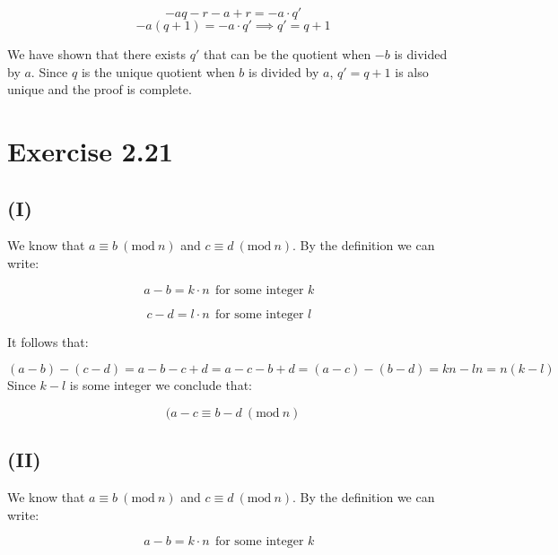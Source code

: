 \documentclass{article}
\begin{document}
\begin{equation*}
	-aq - r - a + r = -a \cdot q'
\end{equation*}
\begin{equation*}
	-a(q+1) = -a \cdot q' \implies q' = q + 1
\end{equation*}

We have shown that there exists \(q'\) that can be the quotient when \(-b\) is
divided by \(a\). Since \(q\) is the unique quotient when \(b\) is divided by
\(a\), \(q' = q + 1\) is also unique and the proof is complete. 


\section*{Exercise 2.21}

\subsection*{(I)}

We know that \(a \equiv b \ (\textrm{mod}\ n)\) and \(c \equiv d \
(\textrm{mod}\ n)\). By the definition we can write:

\begin{equation*}
	a - b = k \cdot n \ \ \textrm{for some integer \(k\) }
\end{equation*}


\begin{equation*}
	c - d = l \cdot n \ \ \textrm{for some integer \(l\) }
\end{equation*}

It follows that:

\begin{equation*}
	(a - b) - (c-d) = a - b - c + d = a - c - b + d = (a - c) - (b - d) =
	kn - ln = n(k-l)
\end{equation*}
Since \(k -l\) is some integer we conclude that:

\begin{equation*}
	(a - c \equiv b - d \ (\textrm{mod}\ n)
\end{equation*}


\subsection*{(II)}


We know that \(a \equiv b \ (\textrm{mod}\ n)\) and \(c \equiv d \
(\textrm{mod}\ n)\). By the definition we can write:


\begin{equation*}
	a - b = k \cdot n \ \ \textrm{for some integer \(k\) }
\end{equation*}
\end{document}
